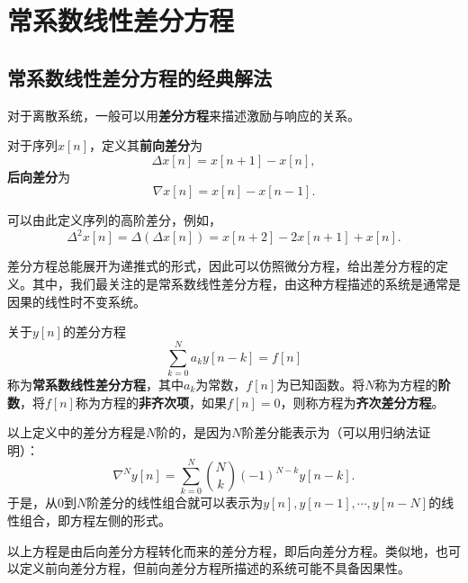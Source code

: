 \section{常系数线性差分方程}

\subsection{常系数线性差分方程的经典解法}\label{sub:difference_equation}

对于离散系统，一般可以用\textbf{差分方程}来描述激励与响应的关系。

\begin{definition}[差分]
    对于序列$x[n]$，定义其\textbf{前向差分}为
    \begin{equation}
        \Delta x[n]=x[n+1]-x[n],
    \end{equation}
    \textbf{后向差分}为
    \begin{equation}
        \nabla x[n]=x[n]-x[n-1].
    \end{equation}
\end{definition}

可以由此定义序列的高阶差分，例如，
\begin{equation}
    \Delta^2 x[n]=\Delta(\Delta x[n])=x[n+2]-2x[n+1]+x[n].
\end{equation}

差分方程总能展开为递推式的形式，因此可以仿照微分方程，给出差分方程的定义。其中，我们最关注的是常系数线性差分方程，由这种方程描述的系统是通常是因果的线性时不变系统。
\begin{definition}[常系数线性差分方程]
    关于$y[n]$的差分方程
    \begin{equation}
        \sum_{k=0}^{N}a_k y[n-k]=f[n]
    \end{equation}
    称为\textbf{常系数线性差分方程}，其中$a_k$为常数，$f[n]$为已知函数。将$N$称为方程的\textbf{阶数}，将$f[n]$称为方程的\textbf{非齐次项}，如果$f[n]=0$，则称方程为\textbf{齐次差分方程}。
\end{definition}

以上定义中的差分方程是$N$阶的，是因为$N$阶差分能表示为（可以用归纳法证明）：
\begin{equation}
    \nabla^N y[n]=\sum_{k=0}^{N}\binom{N}{k}(-1)^{N-k}y[n-k].
\end{equation}
于是，从$0$到$N$阶差分的线性组合就可以表示为$y[n],y[n-1],\cdots,y[n-N]$的线性组合，即方程左侧的形式。

以上方程是由后向差分方程转化而来的差分方程，即后向差分方程。类似地，也可以定义前向差分方程，但前向差分方程所描述的系统可能不具备因果性。

